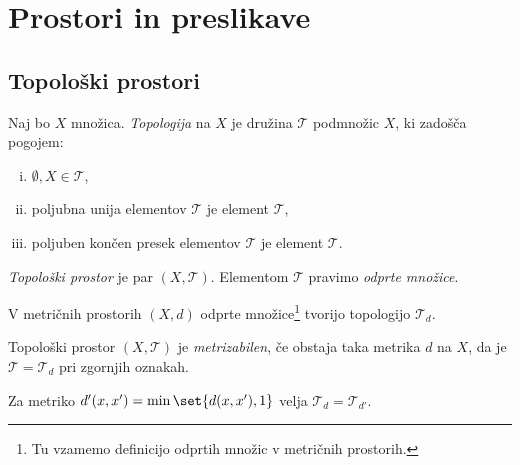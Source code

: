
\section{Prostori in preslikave}

\subsection{Topološki prostori}

\begin{okvir}
\begin{definicija}
Naj bo $X$ množica. \emph{Topologija} na $X$ je družina $\mathcal{T}$ podmnožic $X$, ki zadošča pogojem:

\begin{enumerate}[i)]
\item $\emptyset, X\in\mathcal{T}$,
\item poljubna unija elementov $\mathcal{T}$ je element $\mathcal{T}$,
\item poljuben končen presek elementov $\mathcal{T}$ je element $\mathcal{T}$.
\end{enumerate}

\emph{Topološki prostor} je par $(X,\mathcal{T})$. Elementom $\mathcal{T}$ pravimo \emph{odprte množice}.
\end{definicija}
\end{okvir}

\begin{opomba}
V metričnih prostorih $(X,d)$ odprte množice\footnote{Tu vzamemo definicijo odprtih množic v metričnih prostorih.} tvorijo topologijo $\mathcal{T}_d$.
\end{opomba}

\begin{definicija}
Topološki prostor $(X,\mathcal{T})$ je \emph{metrizabilen}, če obstaja taka metrika $d$ na $X$, da je $\mathcal{T}=\mathcal{T}_d$ pri zgornjih oznakah.
\end{definicija}

\begin{opomba}
Za metriko $d'(x,x')=\min\set{d(x,x'),1}$ velja $\mathcal{T}_d=\mathcal{T}_{d'}$.
\end{opomba}